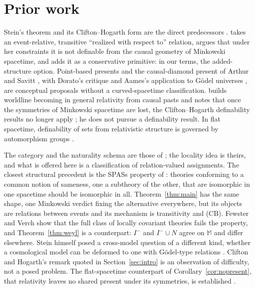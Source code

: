 \documentclass[11pt]{article}
\theoremstyle{definition}
\newcommand{\Mink}{\mathbb M}
\newcommand{\Ichr}{I^{-}}
\begin{document}
\section{Prior work}\label{sec:prior}

Stein's theorem and its Clifton--Hogarth form are the direct predecessors
\citep{Stein1968,Stein1991,CH1995}. \citet{Rakic1997} takes an event-relative,
transitive ``realized with respect to'' relation, argues that under her
constraints it is not definable from the causal geometry of Minkowski
spacetime, and adds it as a conservative primitive: in our terms, the
added-structure option. Point-based presents \citep{Muller2006}
and the causal-diamond present of Arthur and Savitt
\citep{Arthur2006,Arthur2019,Savitt2009,Savitt2015}, with Dorato's critique
\citep{Dorato2011} and Aames's application to Gödel universes \citep{Aames2022},
are conceptual proposals without a curved-spacetime classification.
\citet{Earman2008} builds worldline becoming in general relativity from causal
pasts and notes that once the symmetries of Minkowski spacetime are lost, the
Clifton--Hogarth definability results no longer apply \citep[p.~151]{Earman2008};
he does not pursue a definability result. In flat
spacetime, definability of sets from relativistic structure is governed by
automorphism groups \citep{MSS2025}.

The category and the naturality schema are those of \citet{BFV2003}; the
locality idea is theirs, and what is offered here is a classification of
relation-valued assignments. The closest structural precedent is the SPASs
property of \citet{FV2012}: theories conforming to a common notion of sameness,
one a subtheory of the other, that are isomorphic in one spacetime should be
isomorphic in all. Theorem~\ref{thm:main} has the same shape, one Minkowski verdict
fixing the alternative everywhere, but its objects are relations between events
and its mechanism is transitivity and (CB). Fewster and Verch show that the full
class of locally covariant theories fails the property, and
Theorem~\ref{thm:weyl} is a counterpart: $\Ichr$ and $\Ichr\cup N$ agree on
$\Mink$ and differ elsewhere. Stein himself posed a cross-model question of a
different kind, whether a cosmological model can be deformed to one with
Gödel-type relations \citep[p.~594]{Stein1970}. Clifton and Hogarth's remark
quoted in Section~\ref{sec:intro} is an observation of difficulty, not a posed
problem. The flat-spacetime counterpart of Corollary~\ref{cor:nopresent}, that
relativity leaves no shared present under its symmetries, is established
\citep{Callender2000,Saunders2002}.
\end{document}
